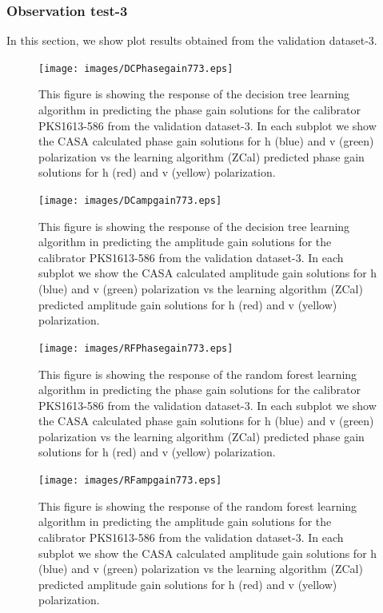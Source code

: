 \subsubsection{Observation test-3}
In this section, we show plot results obtained from the validation dataset-3. 
\begin{figure}[H]
    \texttt{[image: images/DCPhasegain773.eps]}
    \caption{This figure is showing the response of the decision tree learning algorithm in predicting the phase gain solutions for the calibrator PKS1613-586 from the validation dataset-3. In each subplot we show the CASA calculated phase gain solutions for h (blue) and v (green) polarization vs the learning algorithm (ZCal) predicted phase gain solutions for h (red) and v (yellow) polarization.}
    \label{obs9}
\end{figure}

\begin{figure}[H]
    \texttt{[image: images/DCampgain773.eps]}
    \caption{This figure is showing the response of the decision tree learning algorithm in predicting the amplitude gain solutions for the calibrator PKS1613-586 from the validation dataset-3. In each subplot we show the CASA calculated amplitude gain solutions for h (blue) and v (green) polarization vs the learning algorithm (ZCal) predicted amplitude gain solutions for h (red) and v (yellow) polarization.}
     \label{da3}
\end{figure}


\begin{figure}[H]
    \texttt{[image: images/RFPhasegain773.eps]}
    \caption{This figure is showing the response of the random forest learning algorithm in predicting the phase gain solutions for the calibrator PKS1613-586 from the validation dataset-3. In each subplot we show the CASA calculated phase gain solutions for h (blue) and v (green) polarization vs the learning algorithm (ZCal) predicted phase gain solutions for h (red) and v (yellow) polarization.}
    \label{obs10}
\end{figure}

\begin{figure}[H]
    \texttt{[image: images/RFampgain773.eps]}
    \caption{This figure is showing the response of the random forest learning algorithm in predicting the amplitude gain solutions for the calibrator PKS1613-586 from the validation dataset-3. In each subplot we show the CASA calculated amplitude gain solutions for h (blue) and v (green) polarization vs the learning algorithm (ZCal) predicted amplitude gain solutions for h (red) and v (yellow) polarization.}
     \label{ra3}
\end{figure}

